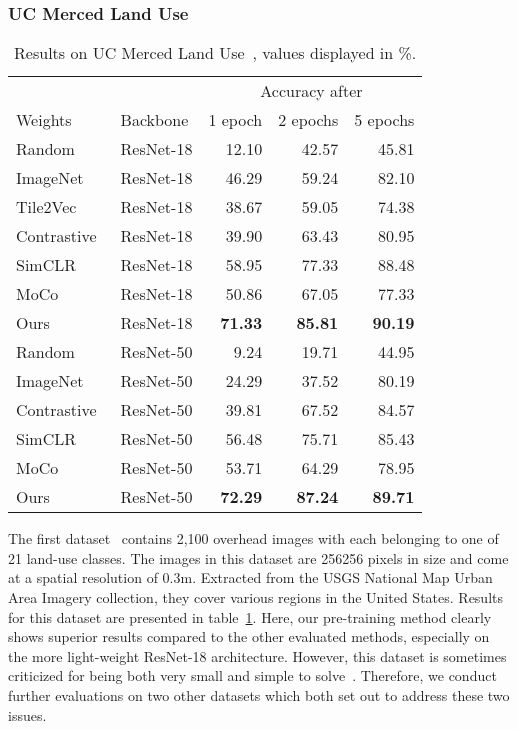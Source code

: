 \documentclass[journal]{IEEEtran}
\begin{document}
\subsubsection{UC Merced Land Use}
\begin{table}
  \center
  \caption{
    Results on UC Merced Land Use~\cite{ucmerced}, values displayed in \%.
  }\label{table:ucmerced}
  \begin{tabular}{llrrr}
    \toprule
    &&\multicolumn{3}{c}{Accuracy after}\\
    Weights&Backbone&1 epoch&2 epochs&5 epochs\\
    \midrule
    Random                        & ResNet-18 & 12.10 & 42.57 & 45.81 \\
    ImageNet                      & ResNet-18 & 46.29 & 59.24 & 82.10 \\
    Tile2Vec~\cite{tile2vec}      & ResNet-18 & 38.67 & 59.05 & 74.38 \\
    Contrastive~\cite{simclr}     & ResNet-18 & 39.90 & 63.43 & 80.95 \\
    SimCLR~\cite{simclr}          & ResNet-18 & 58.95 & 77.33 & 88.48 \\
    MoCo~\cite{he_momentum_2020}  & ResNet-18 & 50.86 & 67.05 & 77.33 \\
    Ours                          & ResNet-18 & \textbf{71.33} & \textbf{85.81} & \textbf{90.19} \\
    \midrule
    Random                        & ResNet-50 &  9.24 & 19.71 & 44.95 \\
    ImageNet                      & ResNet-50 & 24.29 & 37.52 & 80.19 \\
    Contrastive~\cite{simclr}     & ResNet-50 & 39.81 & 67.52 & 84.57 \\
    SimCLR~\cite{simclr}          & ResNet-50 & 56.48 & 75.71 & 85.43 \\
    MoCo~\cite{he_momentum_2020}  & ResNet-50 & 53.71 & 64.29 & 78.95 \\
    Ours                          & ResNet-50 & \textbf{72.29} & \textbf{87.24} & \textbf{89.71} \\
    \bottomrule
  \end{tabular}
  \vspace{6pt}
\end{table}
 The first dataset~\cite{ucmerced} contains 2,100 overhead images
with each belonging to one of 21 land-use classes.
The images in this dataset are 256256 pixels in size
and come at a spatial resolution of 0.3m.
Extracted from the USGS National Map Urban Area Imagery collection,
they cover various regions in the United States.
Results for this dataset are presented in table~\ref{table:ucmerced}.
Here, our pre-training method clearly shows superior results compared to the other evaluated methods,
especially on the more light-weight ResNet-18 architecture.
However, this dataset is sometimes criticized for
being both very small and simple to solve~\cite{resisc45,xia_aid_2017}.
Therefore, we conduct further evaluations on two other datasets
which both set out to address these two issues.
\end{document}
